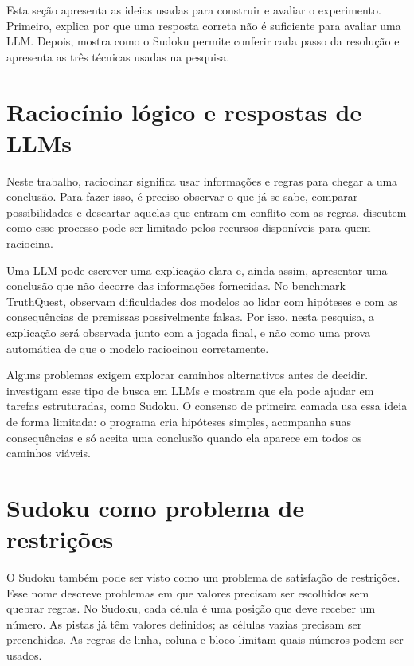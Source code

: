 
Esta seção apresenta as ideias usadas para construir e avaliar o experimento. Primeiro, explica por que uma resposta correta não é suficiente para avaliar uma LLM. Depois, mostra como o Sudoku permite conferir cada passo da resolução e apresenta as três técnicas usadas na pesquisa.

\section{Raciocínio lógico e respostas de LLMs}

Neste trabalho, raciocinar significa usar informações e regras para chegar a uma conclusão. Para fazer isso, é preciso observar o que já se sabe, comparar possibilidades e descartar aquelas que entram em conflito com as regras.  discutem como esse processo pode ser limitado pelos recursos disponíveis para quem raciocina.

Uma LLM pode escrever uma explicação clara e, ainda assim, apresentar uma conclusão que não decorre das informações fornecidas. No benchmark TruthQuest,  observam dificuldades dos modelos ao lidar com hipóteses e com as consequências de premissas possivelmente falsas. Por isso, nesta pesquisa, a explicação será observada junto com a jogada final, e não como uma prova automática de que o modelo raciocinou corretamente.

Alguns problemas exigem explorar caminhos alternativos antes de decidir.  investigam esse tipo de busca em LLMs e mostram que ela pode ajudar em tarefas estruturadas, como Sudoku. O consenso de primeira camada usa essa ideia de forma limitada: o programa cria hipóteses simples, acompanha suas consequências e só aceita uma conclusão quando ela aparece em todos os caminhos viáveis.

\section{Sudoku como problema de restrições}

O Sudoku também pode ser visto como um problema de satisfação de restrições. Esse nome descreve problemas em que valores precisam ser escolhidos sem quebrar regras. No Sudoku, cada célula é uma posição que deve receber um número. As pistas já têm valores definidos; as células vazias precisam ser preenchidas. As regras de linha, coluna e bloco limitam quais números podem ser usados.

